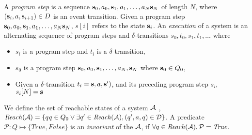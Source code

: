 A \emph{program step} is a sequence  ${\textbf{s}}_0 , a_0,  {\textbf{s}}_1, a_1, \ldots  ,a_N {\textbf{s}}_N$ of length $N$, where $({\textbf{s}}_i , a , {\textbf{s}}_{i+1}) \in D$ is an event transition. Given a program step ${\textbf{s}}_0 , a_0,  {\textbf{s}}_1, a_1, \ldots  ,a_N {\textbf{s}}_N$, $s[i]$ refers to the state ${\textbf{s}}_i$. An \emph{execution} of a system is an alternating sequence of program steps and $\delta$-transitions $s_0, t_0 , s_1, t_1, \ldots$ where
\begin{itemize}
\item $s_i$ is a program step and $t_i$ is a $\delta$-transition,
\item $s_0$ is a program step ${\textbf{s}}_0, a_0, {\textbf{s}}_1, \ldots ,a_N, {\textbf{s}}_N $  where ${\textbf{s}}_0 \in Q_0$,
\item Given a $\delta$-transition $t_i = {\textbf{s}}, a, {\textbf{s}}')$, and its preceding program step $s_i$,  $s_i[N] = {\textbf{s}} $
\end{itemize}
%



We define the set of reachable states of a system $\mathcal{A}$ , $\mathit{Reach}(\mathcal{A}) = \{q \mathit q \in Q_0 \vee \exists q^\prime \in \mathit{Reach}(\mathcal{A}), (q^\prime, a, q) \in \mathcal{D} \}$. A predicate $\mathcal{P} : Q \mapsto \{\mathit{True}, \mathit{False}\}$ is an \emph{invariant} of the $\mathcal{A}$, if $\forall q \in \mathit{Reach}(\mathcal{A}), \mathcal{P} = \mathit{True}$.




